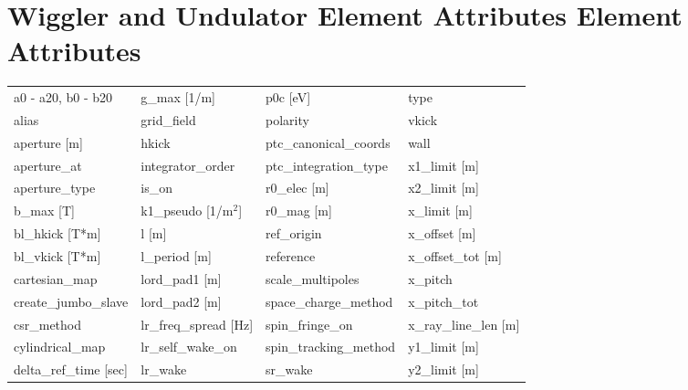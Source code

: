  \section{Wiggler and Undulator Element Attributes Element Attributes}
 \label{s:list.wiggler}
 
 \begin{tabular}{llll} \toprule
a0 - a20, b0 - b20             & g_max [1/m]                    & p0c [eV]                       & type                           \\
alias                          & grid_field                     & polarity                       & vkick                          \\
aperture [m]                   & hkick                          & ptc_canonical_coords           & wall                           \\
aperture_at                    & integrator_order               & ptc_integration_type           & x1_limit [m]                   \\
aperture_type                  & is_on                          & r0_elec [m]                    & x2_limit [m]                   \\
b_max [T]                      & k1_pseudo [1/m$^2$]            & r0_mag [m]                     & x_limit [m]                    \\
bl_hkick [T*m]                 & l [m]                          & ref_origin                     & x_offset [m]                   \\
bl_vkick [T*m]                 & l_period [m]                   & reference                      & x_offset_tot [m]               \\
cartesian_map                  & lord_pad1 [m]                  & scale_multipoles               & x_pitch                        \\
create_jumbo_slave             & lord_pad2 [m]                  & space_charge_method            & x_pitch_tot                    \\
csr_method                     & lr_freq_spread [Hz]            & spin_fringe_on                 & x_ray_line_len [m]             \\
cylindrical_map                & lr_self_wake_on                & spin_tracking_method           & y1_limit [m]                   \\
delta_ref_time [sec]           & lr_wake                        & sr_wake                        & y2_limit [m]                   \\

\end{tabular}
